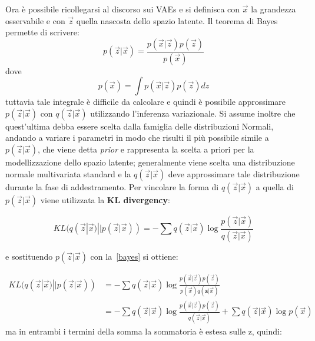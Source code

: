 Ora è possibile ricollegarsi al discorso sui VAEs e si definisca con $\vec{x}$ la grandezza osservabile e con $\vec{z}$ quella nascosta dello spazio latente. Il teorema di Bayes \cite{Statistica} permette di scrivere:
\begin{equation}
	p(\vec{z}|\vec{x}) = \frac{p(\vec{x}|\vec{z}) p(\vec{z})}{p(\vec{x})}
	\label{bayes}
\end{equation}
dove
\begin{equation}
	p(\vec{x}) = \int p(\vec{x}|\vec{z}) p(\vec{z}) dz
	\label{integrale}
\end{equation}
tuttavia tale integrale è difficile da calcolare e quindi è possibile approssimare $p(\vec{z}|\vec{x})$ con $q(\vec{z}|\vec{x})$ utilizzando l'inferenza variazionale. Si assume inoltre che quest'ultima debba essere scelta dalla famiglia delle distribuzioni Normali, andando a variare i parametri in modo che risulti il più possibile simile a $p(\vec{z}|\vec{x})$, che viene detta \textit{prior} e rappresenta la scelta a priori per la modellizzazione dello spazio latente; generalmente viene scelta una distribuzione normale multivariata standard e la $q(\vec{z}|\vec{x})$ deve approssimare tale distribuzione durante la fase di addestramento. Per vincolare la forma di $q(\vec{z}|\vec{x})$ a quella di $p(\vec{z}|\vec{x})$ viene utilizzata la \textbf{KL divergency}: 


\begin{equation}
	KL (q(\vec{z}|\vec{x}) || p(\vec{z}|\vec{x})) = -\sum q(\vec{z}|\vec{x}) \log \frac{p(\vec{z}|\vec{x})}{q(\vec{z}|\vec{x})}
\end{equation}

e sostituendo $p(\vec{z}|\vec{x})$ con la~\ref{bayes} si ottiene:


\begin{align*} 
	KL (q(\vec{z}|\vec{x}) || p(\vec{z}|\vec{x})) &=  -\sum q(\vec{z}|\vec{x}) \log \frac{p(\vec{x}|\vec{z})p(\vec{z})}{p(\vec{x})q(\textbf{z}|\vec{x})} \\ &=  -\sum q(\vec{z}|\vec{x})\log \frac{p(\vec{x}|\vec{z})p(\vec{z})}{q(\vec{z}|\vec{x})} + \sum q(\vec{z}|\vec{x})\log p(\vec{x})
\end{align*}
ma in entrambi i termini della somma la sommatoria è estesa sulle z, quindi:

